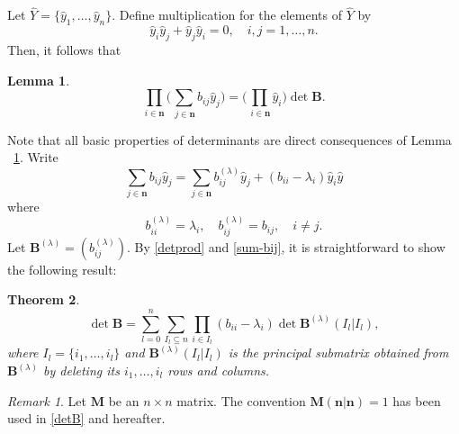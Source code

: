 \documentclass{article}
\newtheorem{thm}{Theorem}[section]
\newtheorem{lem}[thm]{Lemma}
\theoremstyle{definition}
\theoremstyle{remark}
\newtheorem{rem}{Remark}[section]
\newcommand{\wh}{\widehat}
\begin{document}
Let $\wh Y=\{\hat y_1,\dots,\hat y_n\}$. Define multiplication
for the elements of $\wh Y$ by
\begin{equation}
\hat y_i\hat y_j+\hat y_j\hat y_i=0,\quad i,j=1,\dots,n.
\end{equation}
Then, it follows that
\begin{lem}\label{lem-det}
\begin{equation}\label{detprod}
\prod_{i\in\symbf{n}}
\biggl(\sum_{\,j\in\symbf{n}}b_{ij}\hat y_j\biggr)
=\biggl(\prod_{\,i\in\symbf{n}}\hat y_i\biggr)\det\symbf{B}.
\end{equation}
\end{lem}

Note that all basic properties of determinants are direct consequences
of Lemma ~\ref{lem-det}. Write
\begin{equation}\label{sum-bij}
\sum_{j\in\symbf{n}}b_{ij}\hat y_j=\sum_{j\in\symbf{n}}b^{(\lambda)}
_{ij}\hat y_j+(b_{ii}-\lambda_i)\hat y_i\hat y
\end{equation}
where
\begin{equation}
b^{(\lambda)}_{ii}=\lambda_i,\quad b^{(\lambda)}_{ij}=b_{ij},
\quad i\not=j.
\end{equation}
Let $\symbf{B}^{(\lambda)}=(b^{(\lambda)}_{ij})$. By \eqref{detprod}
and \eqref{sum-bij}, it is
straightforward to show the following
result:
\begin{thm}\label{thm-main}
\begin{equation}\label{detB}
\det\symbf{B}=
\sum^n_{l =0}\sum_{I_l \subseteq n}
\prod_{i\in I_l}(b_{ii}-\lambda_i)
\det\symbf{B}^{(\lambda)}(I_l |I_l ),
\end{equation}
where $I_l =\{i_1,\dots,i_l \}$ and $\symbf{B}^{(\lambda)}(I_l |I_l )$
is the principal submatrix obtained from $\symbf{B}^{(\lambda)}$
by deleting its $i_1,\dots,i_l $ rows and columns.
\end{thm}

\begin{rem}
Let $\symbf{M}$ be an $n\times n$ matrix. The convention
$\symbf{M}(\symbf{n}|\symbf{n})=1$ has been used in \eqref{detB} and
hereafter.
\end{rem}
\end{document}
